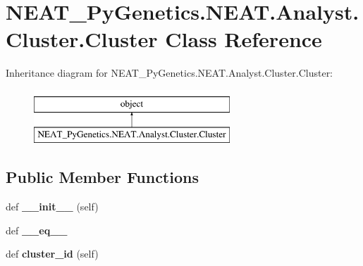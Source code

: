 \hypertarget{class_n_e_a_t___py_genetics_1_1_n_e_a_t_1_1_analyst_1_1_cluster_1_1_cluster}{}\section{N\+E\+A\+T\+\_\+\+Py\+Genetics.\+N\+E\+A\+T.\+Analyst.\+Cluster.\+Cluster Class Reference}
\label{class_n_e_a_t___py_genetics_1_1_n_e_a_t_1_1_analyst_1_1_cluster_1_1_cluster}
Inheritance diagram for N\+E\+A\+T\+\_\+\+Py\+Genetics.\+N\+E\+A\+T.\+Analyst.\+Cluster.\+Cluster\+:\begin{figure}[H]
\begin{center}
\leavevmode
\includegraphics[height=2.000000cm]{class_n_e_a_t___py_genetics_1_1_n_e_a_t_1_1_analyst_1_1_cluster_1_1_cluster}
\end{center}
\end{figure}
\subsection*{Public Member Functions}
\begin{DoxyCompactItemize}
\item 
def {\bfseries \+\_\+\+\_\+init\+\_\+\+\_\+} (self)\hypertarget{class_n_e_a_t___py_genetics_1_1_n_e_a_t_1_1_analyst_1_1_cluster_1_1_cluster_a12ebc01de1535941e1af477dddaedbe9}{}\label{class_n_e_a_t___py_genetics_1_1_n_e_a_t_1_1_analyst_1_1_cluster_1_1_cluster_a12ebc01de1535941e1af477dddaedbe9}

\item 
def {\bfseries \+\_\+\+\_\+eq\+\_\+\+\_\+}\hypertarget{class_n_e_a_t___py_genetics_1_1_n_e_a_t_1_1_analyst_1_1_cluster_1_1_cluster_a85d2dfa24ff6846be17920a77987ece5}{}\label{class_n_e_a_t___py_genetics_1_1_n_e_a_t_1_1_analyst_1_1_cluster_1_1_cluster_a85d2dfa24ff6846be17920a77987ece5}

\item 
def {\bfseries cluster\+\_\+id} (self)\hypertarget{class_n_e_a_t___py_genetics_1_1_n_e_a_t_1_1_analyst_1_1_cluster_1_1_cluster_a691632bc1747f486a4f1c8fe3ee02265}{}\label{class_n_e_a_t___py_genetics_1_1_n_e_a_t_1_1_analyst_1_1_cluster_1_1_cluster_a691632bc1747f486a4f1c8fe3ee02265}

\end{DoxyCompactItemize}
